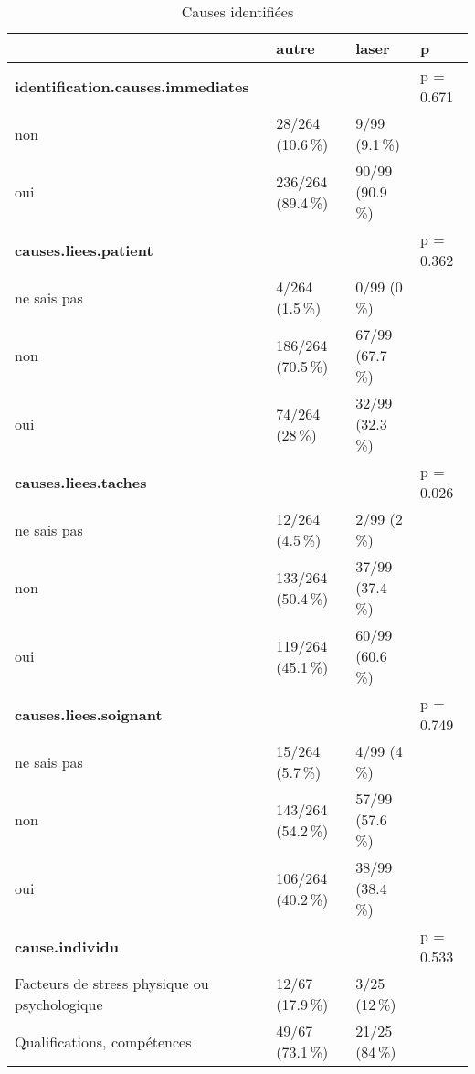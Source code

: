 \documentclass[a4paper,fontsize=10pt,french]{scrartcl}
\begin{document}
\begin{table}

\caption{\label{tab:tabcomp}Causes identifiées}
\centering
\begin{tabularx}{\linewidth}[t]{X|l|l|l}
  \toprule
  & autre & laser & p\\
\midrule
\textbf{identification.causes.immediates} &  &  & p = 0.671\\
 
non & 28/264 (10.6\,\%) & 9/99 (9.1\,\%) & \\
 
oui & 236/264 (89.4\,\%) & 90/99 (90.9\,\%) & \\
\midrule
\textbf{causes.liees.patient} &  &  & p = 0.362\\
 
ne sais pas & 4/264 (1.5\,\%) & 0/99 (0\,\%) & \\
 
non & 186/264 (70.5\,\%) & 67/99 (67.7\,\%) & \\
 
oui & 74/264 (28\,\%) & 32/99 (32.3\,\%) & \\
\midrule
\textbf{causes.liees.taches} &  &  & p = 0.026\\
 
ne sais pas & 12/264 (4.5\,\%) & 2/99 (2\,\%) & \\
 
non & 133/264 (50.4\,\%) & 37/99 (37.4\,\%) & \\
 
oui & 119/264 (45.1\,\%) & 60/99 (60.6\,\%) & \\
\midrule
\textbf{causes.liees.soignant} &  &  & p = 0.749\\
 
ne sais pas & 15/264 (5.7\,\%) & 4/99 (4\,\%) & \\
 
non & 143/264 (54.2\,\%) & 57/99 (57.6\,\%) & \\
 
oui & 106/264 (40.2\,\%) & 38/99 (38.4\,\%) & \\
\midrule
\textbf{cause.individu} &  &  & p = 0.533\\
 
Facteurs de stress physique ou psychologique & 12/67 (17.9\,\%) & 3/25 (12\,\%) & \\
 
Qualifications, compétences & 49/67 (73.1\,\%) & 21/25 (84\,\%) & \\
 

\end{tabularx}
\end{table}
\end{document}
